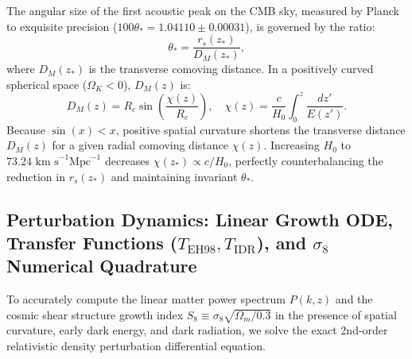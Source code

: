 \documentclass[11pt,a4paper]{article}
\theoremstyle{definition}
\begin{document}
The angular size of the first acoustic peak on the CMB sky, measured by Planck to exquisite precision ($100\theta_* = 1.04110 \pm 0.00031$), is governed by the ratio:
\begin{equation}
\theta_* = \frac{r_s(z_*)}{D_M(z_*)},
\end{equation}
where $D_M(z_*)$ is the transverse comoving distance. In a positively curved spherical space ($\Omega_K < 0$), $D_M(z)$ is:
\begin{equation}
D_M(z) = R_c \sin\left(\frac{\chi(z)}{R_c}\right), \quad \chi(z) = \frac{c}{H_0} \int_0^z \frac{dz'}{E(z')}.
\end{equation}
Because $\sin(x) < x$, positive spatial curvature shortens the transverse distance $D_M(z)$ for a given radial comoving distance $\chi(z)$. Increasing $H_0$ to $73.24\text{ km s}^{-1}\text{Mpc}^{-1}$ decreases $\chi(z_*) \propto c/H_0$, perfectly counterbalancing the reduction in $r_s(z_*)$ and maintaining invariant $\theta_*$.

\subsection{Perturbation Dynamics: Linear Growth ODE, Transfer Functions ($T_{\mathrm{EH98}}, T_{\mathrm{IDR}}$), and $\sigma_8$ Numerical Quadrature}

To accurately compute the linear matter power spectrum $P(k, z)$ and the cosmic shear structure growth index $S_8 \equiv \sigma_8 \sqrt{\Omega_m/0.3}$ in the presence of spatial curvature, early dark energy, and dark radiation, we solve the exact 2nd-order relativistic density perturbation differential equation.
\end{document}

